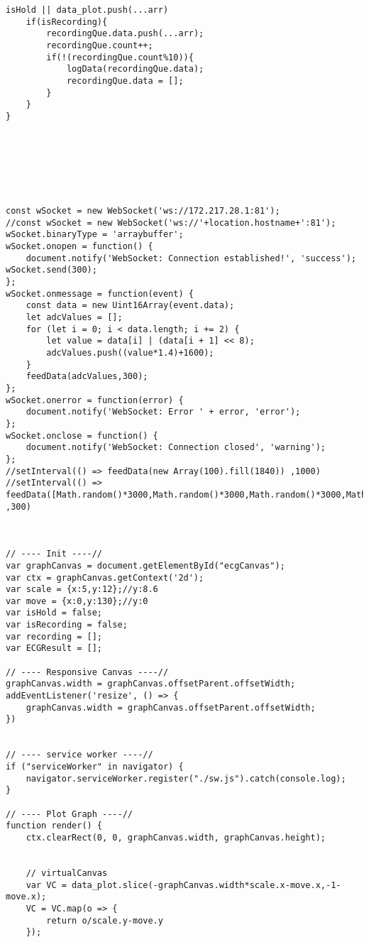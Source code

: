 \begin{lstlisting}[style=htmlcssjs]
    isHold || data_plot.push(...arr)
    if(isRecording){
        recordingQue.data.push(...arr);
        recordingQue.count++;
        if(!(recordingQue.count%10)){
            logData(recordingQue.data);
            recordingQue.data = [];
        }
    }
}







const wSocket = new WebSocket('ws://172.217.28.1:81');
//const wSocket = new WebSocket('ws://'+location.hostname+':81');
wSocket.binaryType = 'arraybuffer';
wSocket.onopen = function() {
    document.notify('WebSocket: Connection established!', 'success'); wSocket.send(300);
};
wSocket.onmessage = function(event) {
    const data = new Uint16Array(event.data);
    let adcValues = [];
    for (let i = 0; i < data.length; i += 2) {
        let value = data[i] | (data[i + 1] << 8);
        adcValues.push((value*1.4)+1600);
    }
    feedData(adcValues,300);
};
wSocket.onerror = function(error) {
    document.notify('WebSocket: Error ' + error, 'error');
};
wSocket.onclose = function() {
    document.notify('WebSocket: Connection closed', 'warning');
}; 
//setInterval(() => feedData(new Array(100).fill(1840)) ,1000)
//setInterval(() => feedData([Math.random()*3000,Math.random()*3000,Math.random()*3000,Math.random()*3000,Math.random()*3000,Math.random()*3000,Math.random()*3000,Math.random()*3000,Math.random()*3000,Math.random()*3000,Math.random()*3000,Math.random()*3000,Math.random()*3000,Math.random()*3000,Math.random()*3000,80]) ,300)



// ---- Init ----//
var graphCanvas = document.getElementById("ecgCanvas");
var ctx = graphCanvas.getContext('2d');
var scale = {x:5,y:12};//y:8.6
var move = {x:0,y:130};//y:0
var isHold = false;
var isRecording = false;
var recording = [];
var ECGResult = [];

// ---- Responsive Canvas ----//
graphCanvas.width = graphCanvas.offsetParent.offsetWidth;
addEventListener('resize', () => {
    graphCanvas.width = graphCanvas.offsetParent.offsetWidth;
})


// ---- service worker ----//
if ("serviceWorker" in navigator) {
    navigator.serviceWorker.register("./sw.js").catch(console.log);
}

// ---- Plot Graph ----//
function render() {
    ctx.clearRect(0, 0, graphCanvas.width, graphCanvas.height);
    
    
    // virtualCanvas
    var VC = data_plot.slice(-graphCanvas.width*scale.x-move.x,-1-move.x);
    VC = VC.map(o => {
        return o/scale.y-move.y
    });
    

\end{lstlisting}
